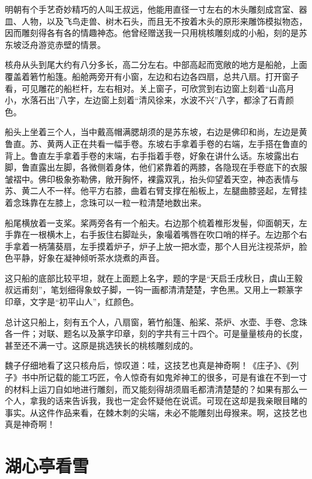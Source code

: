 \documentclass[12pt,UTF-8,openany]{ctexbook}
\begin{document}
\begin{normalsize}
    
    明朝有个手艺奇妙精巧的人叫王叔远，他能用直径一寸左右的木头雕刻成宫室、器皿、人物，以及飞鸟走兽、树木石头，而且无不按着木头的原形来雕饰模拟物态，因而雕刻得各有各的情趣神态。他曾经赠送我一只用桃核雕刻成的小船，刻的是苏东坡泛舟游览赤壁的情景。
    
    核舟从头到尾大约有八分多长，高二分左右。中部高起而宽敞的地方是船舱，上面覆盖着箬竹船篷。船舱两旁开有小窗，左边和右边各四扇，总共八扇。打开窗子看，可见雕花的船栏杆，左右相对。关上窗子，可欣赏到右边窗上刻着“山高月小，水落石出”八字，左边窗上刻着“清风徐来，水波不兴”八字，都涂了石青颜色。
    
    船头上坐着三个人，当中戴高帽满腮胡须的是苏东坡，右边是佛印和尚，左边是黄鲁直。苏、黄两人正在共看一幅手卷。东坡右手拿着手卷的右端，左手搭在鲁直的背上。鲁直左手拿着手卷的末端，右手指着手卷，好象在讲什么话。东坡露出右脚，鲁直露出左脚，各微侧着身体，他们紧靠着的两膝，各隐现在手卷底下的衣服皱褶中。佛印极象弥勒佛，敞开胸怀，裸露双乳，抬头仰望着天空，神态表情与苏、黄二人不一样。他平方右膝，曲着右臂支撑在船板上，左腿曲膝竖起，左臂挂着念珠靠在左膝上，念珠可以一粒一粒清楚地数出来。
    
    船尾横放着一支桨。桨两旁各有一个船夫。右边那个梳着椎形发髻，仰面朝天，左手靠在一根横木上，右手扳住右脚趾头，象嘬着嘴唇在吹口哨的样子。左边那个右手拿着一柄蒲葵扇，左手摸着炉子，炉子上放一把水壶，那个人目光注视茶炉，脸色平静，好象在凝神倾听茶水烧煮的声音。
    
    这只船的底部比较平坦，就在上面题上名字，题的字是“天启壬戌秋日，虞山王毅叔远甫刻”，笔划细得象蚊子脚，一钩一画都清清楚楚，字色黑。又用上一颗篆字印章，文字是“初平山人”，红颜色。
    
    总计这只船上，刻有五个人，八扇窗，箬竹船篷、船桨、茶炉、水壶、手卷、念珠各一件；对联、题名以及篆字印章，刻的字共有三十四个。可是量量核舟的长度，甚至还不满一寸。这原是挑选狭长的桃核雕刻成的。
    
    魏子仔细地看了这只核舟后，惊叹道：哇，这技艺也真是神奇啊！《庄子》、《列子》书中所记载的能工巧匠，令人惊奇有如鬼斧神工的很多，可是有谁在不到一寸的材料上运刀自如地进行雕刻，而又能刻得胡须眉毛都清清楚楚的？如果有那么一个人，拿我的话来告诉我，我也一定会怀疑他在说谎。可现在这却是我亲眼目睹的事实。从这件作品来看，在棘木刺的尖端，未必不能雕刻出母猴来。啊，这技艺也真是神奇啊！
    
\end{normalsize}



\chapter{湖心亭看雪}
\end{document}
